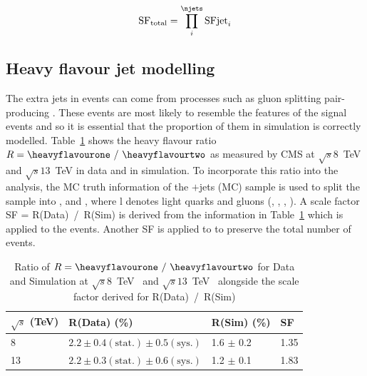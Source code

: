 \begin{equation}
\textrm{SF}_{\textrm{total}} = \prod_{i}^{\njets}\textrm{SFjet}_{i}
\label{eqn:btagcsvtot}
\end{equation}

\subsection{Heavy flavour jet modelling ~\label{ttbbmod}}
The extra jets in \ttbar events can come from processes such as gluon splitting pair-producing \bbbar. These \ttbb events are most likely to resemble the features of the \tttt signal events and so it is essential that the proportion of them in simulation is correctly modelled. Table~\ref{tab:heavyflavR} shows the heavy flavour ratio $R=\heavyflavourone~/~\heavyflavourtwo$ as measured by CMS at $\sqrt{s}8$~TeV and $\sqrt{s}13$~TeV in data and in simulation. To incorporate this ratio into the analysis, the MC truth information of the \ttbar$+$jets (MC) sample is used to split the sample into \ttbb, \ttcc and \ttll, where l denotes light quarks and gluons (\cPqu, \cPqd, \cPqs, \cPg).  A scale factor SF = R(Data)~/~R(Sim) is derived from the information in Table~\ref{tab:heavyflavR} which is applied to the \ttbb events. Another SF is applied to \ttll to preserve the total number of \ttbar events.


\begin{table}[htpb!]
\footnotesize
\begin{center}
\begin{tabular}{|l|l|l|l|}
\hline
$\sqrt{s}$ (TeV)                         & R(Data)  (\%)                                                                             & R(Sim) (\%)       & SF   \\
\hline
8  & $2.2 \pm 0.4 \left( \textrm{stat.} \right) \pm 0.5 \left(\textrm{sys.} \right)$ & 1.6 $\pm$ 0.2 & 1.35 \\
13 & $2.2 \pm 0.3 \left( \textrm{stat.} \right) \pm 0.6 \left(\textrm{sys.} \right)$ & 1.2 $\pm$ 0.1 & 1.83 \\
\hline
\end{tabular}
\caption{Ratio of $R=\heavyflavourone~/~\heavyflavourtwo$ for Data and Simulation at $\sqrt{s}8$~TeV~\cite{Khachatryan2015132} and $\sqrt{s}13$~TeV~\cite{CMS-PAS-TOP-16-010} alongside the scale factor derived for R(Data)~/~R(Sim)}
\label{tab:heavyflavR}
\end{center}
\end{table}

